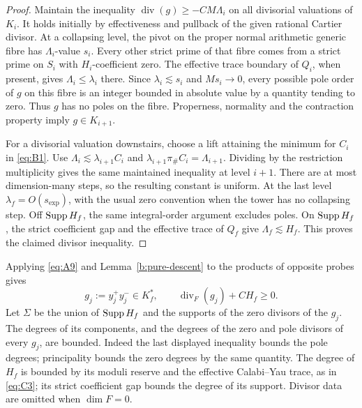 \begin{proof}
Maintain the inequality
\(\operatorname{div}(g)\geq-CM\Lambda_i\) on all divisorial valuations
of \(K_i\). It holds initially by effectiveness and pullback of the given
rational Cartier divisor. At a collapsing level, the pivot on the proper normal
arithmetic generic fibre has \(\Lambda_i\)-value \(s_i\). Every other strict
prime of that fibre comes from a strict prime on \(S_i\) with
\(H_i\)-coefficient zero. The effective trace boundary of \(Q_i\), when
present, gives \(\Lambda_i\leq\lambda_i\) there. Since
\(\lambda_i\lesssim s_i\) and \(Ms_i\to0\), every possible pole order of
\(g\) on this fibre is an integer bounded in absolute value by a quantity
tending to zero. Thus \(g\) has no poles on the fibre. Properness, normality
and the contraction property imply \(g\in K_{i+1}\).

For a divisorial valuation downstairs, choose a lift attaining the minimum
for \(C_i\) in \eqref{eq:B1}. Use
\(\Lambda_i\lesssim\lambda_{i+1}C_i\) and
\(\lambda_{i+1}\pi_\#C_i=\Lambda_{i+1}\). Dividing by the restriction
multiplicity gives the same maintained inequality at level \(i+1\).
There are at most dimension-many steps, so the resulting constant is
uniform. At the last level \(\lambda_f=O(s_{\exp})\), with the usual zero
convention when the tower has no collapsing step. Off \(\operatorname{Supp} H_f\), the
same integral-order argument excludes poles. On \(\operatorname{Supp} H_f\), the strict
coefficient gap and the effective trace of \(Q_f\) give
\(\Lambda_f\lesssim H_f\). This proves the claimed divisor inequality.
\end{proof}

Applying \eqref{eq:A9} and Lemma~\ref{b:pure-descent} to the products of
opposite probes gives
\[
 g_j:=y_j^+y_j^-\in K_f^*,\qquad
 \operatorname{div}_{F}(g_j)+CH_f\geq0.
\]
Let \(\Sigma\) be the union of \(\operatorname{Supp} H_f\) and the supports of the zero
divisors of the \(g_j\). The degrees of its components, and the degrees of
the zero and pole divisors of every \(g_j\), are bounded. Indeed the last
displayed inequality bounds the pole degrees; principality bounds the zero
degrees by the same quantity. The degree of \(H_f\) is bounded by its
moduli reserve and the effective Calabi--Yau trace, as in \eqref{eq:C3};
its strict coefficient gap bounds the degree of its support. Divisor data
are omitted when \(\dim F=0\).

